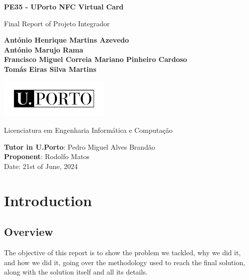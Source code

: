 \documentclass[12pt]{article}
\begin{document}
\begin{titlepage}
	\begin{center}
		\vspace*{1cm}

		{\fontsize{17}{16}\selectfont \textbf{PE35 - UPorto NFC Virtual Card}}


		\vspace{0.5cm}
		Final Report of Projeto Integrador

		\vspace{1.5cm}

		\textbf{António Henrique Martins Azevedo}\\
		\textbf{António Marujo Rama}\\
		\textbf{Francisco Miguel Correia Mariano Pinheiro Cardoso}\\
		\textbf{Tomás Eiras Silva Martins}\\

		\vfill

		\includegraphics[width=0.4\textwidth]{UPORTO_fundotransparente}

		\vfill

		Licenciatura em Engenharia Informática e Computação

		\vspace{0.8cm}

		\textbf{Tutor in U.Porto}: Pedro Miguel Alves Brandão\\
		\textbf{Proponent}: Rodolfo Matos \\

		\vspace{0.4cm}
		Date: 21st of June, 2024

	\end{center}
\end{titlepage}


\thispagestyle{empty}
\clearpage

\thispagestyle{empty}
\tableofcontents

\clearpage

\section{Introduction}

\subsection{Overview}
The objective of this report is to show the problem we tackled, why we did it, and how we did it,
going over the methodology used to reach the final solution, along with the solution itself and all its details.
\end{document}
